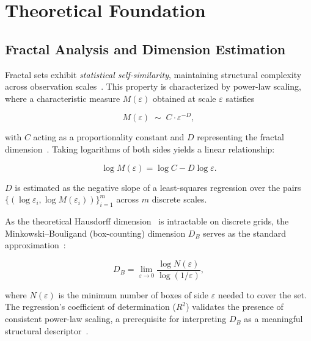 \section{Theoretical Foundation}
\label{sec:theory}

\subsection{Fractal Analysis and Dimension Estimation}
\label{sec:theory:fractal}

Fractal sets exhibit \textit{statistical self-similarity}, maintaining structural complexity across observation scales~\cite{Mandelbrot1982}. This property is characterized by power-law scaling, where a characteristic measure $M(\varepsilon)$ obtained at scale $\varepsilon$ satisfies

\begin{equation}
  M(\varepsilon) \;\sim\; C \cdot \varepsilon^{-D},
  \label{eq:powerlaw}
\end{equation}

\noindent with $C$ acting as a proportionality constant and $D$ representing the fractal dimension~\cite{Falconer2003}. Taking logarithms of both sides yields a linear relationship:

\begin{equation}
  \log M(\varepsilon) = \log C - D \log \varepsilon.
  \label{eq:loglog}
\end{equation}

\noindent $D$ is estimated as the negative slope of a least-squares regression over the pairs $\{(\log \varepsilon_i, \log M(\varepsilon_i))\}_{i=1}^{m}$ across $m$ discrete scales.

As the theoretical Hausdorff dimension~\cite{Hausdorff1919} is intractable on discrete grids, the Minkowski--Bouligand (box-counting) dimension $D_B$ serves as the standard approximation~\cite{Falconer2003}:

\begin{equation}
  D_B = \lim_{\varepsilon \to 0}
        \frac{\log N(\varepsilon)}{\log(1/\varepsilon)},
  \label{eq:boxdim}
\end{equation}

\noindent where $N(\varepsilon)$ is the minimum number of boxes of side $\varepsilon$ needed to cover the set. The regression's coefficient of determination ($R^{2}$) validates the presence of consistent power-law scaling, a prerequisite for interpreting $D_B$ as a meaningful structural descriptor~\cite{Lopes2011}.

